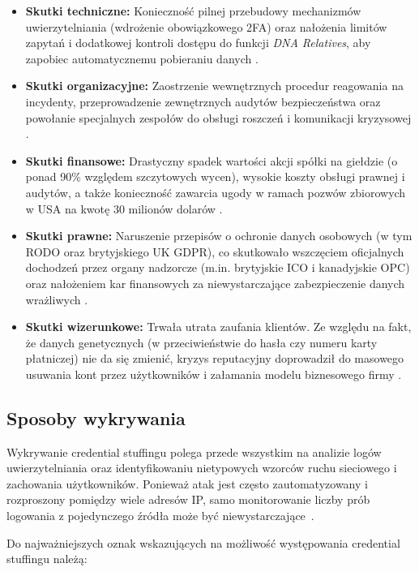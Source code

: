 \documentclass[12pt,a4paper]{article}
\begin{document}
\begin{itemize}
    \item \textbf{Skutki techniczne:} Konieczność pilnej przebudowy mechanizmów uwierzytelniania (wdrożenie obowiązkowego 2FA) oraz nałożenia limitów zapytań i dodatkowej kontroli dostępu do funkcji \textit{DNA Relatives}, aby zapobiec automatycznemu pobieraniu danych \cite{wiki23}.
    \item \textbf{Skutki organizacyjne:} Zaostrzenie wewnętrznych procedur reagowania na incydenty, przeprowadzenie zewnętrznych audytów bezpieczeństwa oraz powołanie specjalnych zespołów do obsługi roszczeń i komunikacji kryzysowej \cite{sec23}.
    \item \textbf{Skutki finansowe:} Drastyczny spadek wartości akcji spółki na giełdzie (o ponad 90\% względem szczytowych wycen), wysokie koszty obsługi prawnej i audytów, a także konieczność zawarcia ugody w ramach pozwów zbiorowych w USA na kwotę 30 milionów dolarów \cite{sec23}.
    \item \textbf{Skutki prawne:} Naruszenie przepisów o ochronie danych osobowych (w tym RODO oraz brytyjskiego UK GDPR), co skutkowało wszczęciem oficjalnych dochodzeń przez organy nadzorcze (m.in. brytyjskie ICO i kanadyjskie OPC) oraz nałożeniem kar finansowych za niewystarczające zabezpieczenie danych wrażliwych \cite{sec23}.
    \item \textbf{Skutki wizerunkowe:} Trwała utrata zaufania klientów. Ze względu na fakt, że danych genetycznych (w przeciwieństwie do hasła czy numeru karty płatniczej) nie da się zmienić, kryzys reputacyjny doprowadził do masowego usuwania kont przez użytkowników i załamania modelu biznesowego firmy \cite{wiki23}.
\end{itemize}

\subsection{Sposoby wykrywania}

Wykrywanie credential stuffingu polega przede wszystkim na analizie logów uwierzytelniania oraz identyfikowaniu nietypowych wzorców ruchu sieciowego i zachowania użytkowników. Ponieważ atak jest często zautomatyzowany i rozproszony pomiędzy wiele adresów IP, samo monitorowanie liczby prób logowania z pojedynczego źródła może być niewystarczające~\cite{owasp_cs,mitre_t1110004}.

Do najważniejszych oznak wskazujących na możliwość występowania credential stuffingu należą:
\end{document}
